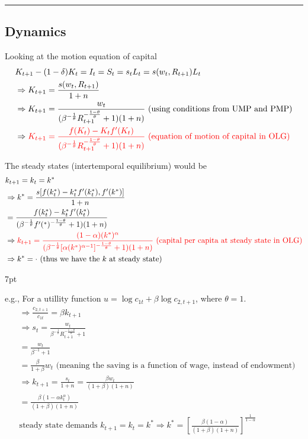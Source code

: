 \documentclass{article}
\newcommand*\sepline{%
  \begin{center}
    \rule[1ex]{.5\textwidth}{.5pt}
  \end{center}}
\newenvironment{greenblock}{%
\def\FrameCommand{%
  \hspace{1pt}%
    {\color{Green}%
    \vrule width 2pt}%
    {\color{greenshade}%
    \vrule width 4pt}%
  \colorbox{greenshade}%
}%
\MakeFramed{%
  \advance%
  \hsize-%
  \width%
  \FrameRestore}%
\noindent\hspace{-4.55pt}%
\begin{adjustwidth}{}{7pt}%
\vspace{2pt}\vspace{2pt}%
}
{%
\vspace{2pt}\end{adjustwidth}\endMakeFramed%
}
\begin{document}
\sepline
\subsection{Dynamics}

Looking at the motion equation of capital
\begin{align}
&K_{t+1}-(1-\delta)K_{t}=I_{t}=S_{t}=s_{t}L_{t}=s(w_{t},R_{t+1}) L_{t}
\\&\Rightarrow K_{t+1}=\frac{s(w_{t},R_{t+1})}{1+n}
\\&\Rightarrow K_{t+1}=\frac{w_{t}}{(\beta^{-\frac{1}{\theta}}R_{t+1}^{-\frac{1-\theta}{\theta}}+1)(1+n)} \text{ (using conditions from UMP and PMP)}
\\&\Rightarrow \color{red} K_{t+1}=\frac{f(K_{t})-K_{t}f'(K_{t})}{(\beta^{-\frac{1}{\theta}}R_{t+1}^{-\frac{1-\theta}{\theta}}+1)(1+n)} \text{ (equation of motion of capital in OLG)}
\end{align}

The steady states (intertemporal equilibrium) would be
\begin{align}
&k_{t+1}=k_{t}=k^{*}
\\& \Rightarrow k^{*}=\frac{s[f(k^{*}_{t})-k^{*}_{t}f'(k^{*}_{t}),f'(k^{*})]}{1+n}
\\&=\frac{f(k^{*}_{t})-k^{*}_{t}f'(k^{*}_{t})}{(\beta^{-\frac{1}{\theta}}f'(^{*})^{-\frac{1-\theta}{\theta}}+1)(1+n)}
\\&\Rightarrow \color{red} k_{t+1}=\frac{(1-\alpha)(k^{*})^\alpha}{(\beta^{-\frac{1}{\theta}}[\alpha(k^{*})^{\alpha-1}]^{-\frac{1-\theta}{\theta}}+1)(1+n)} \text{ (capital per capita at steady state in OLG)}
\\&\Rightarrow k^{*}= \cdot \text{ (thus we have the $k$ at steady state)}
\end{align}


\begin{greenblock}
e.g., For a utillity function $u=\log c_{1t}+\beta \log c_{2,t+1}$, where $\theta=1$.
\begin{align}
&\Rightarrow \frac{c_{2,t+1}}{c_{1t}}=\beta k_{t+1}
\\&\Rightarrow s_{t}=\frac{w_{t}}{\beta^{-\frac{1}{\theta}}R_{t+1}^{-\frac{1-\theta}{\theta}}+1}
\\&=\frac{w_{t}}{\beta^{-1}+1}
\\&=\frac{\beta}{1+\beta}w_{t} \text{ (meaning the saving is a function of wage, instead of endowment)}
\\&\Rightarrow k_{t+1}=\frac{s_{t}}{1+n}=\frac{\beta w_{t}}{(1+\beta)(1+n)}
\\&=\frac{\beta (1-\alpha k_{t}^{\alpha})}{(1+\beta)(1+n)}
\\& \text{steady state demands }k_{t+1}=k_{t}=k^{*} \Rightarrow k^{*}=[\frac{\beta (1-\alpha)}{(1+\beta)(1+n)}]^{\frac{1}{1-\alpha}}
\end{align}
\end{greenblock}
\end{document}
